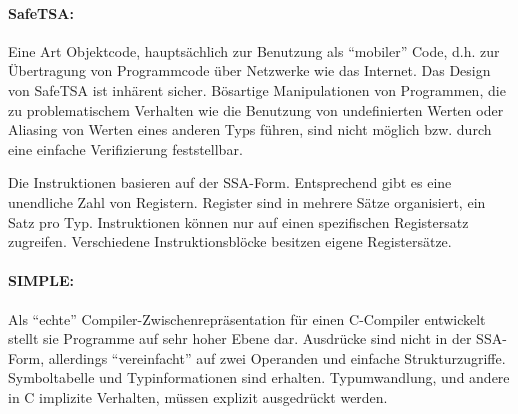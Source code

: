 \documentclass[twoside,a4paper,fleqn,12pt]{article}
\begin{document}


\paragraph{SafeTSA:} Eine Art Objektcode, hauptsächlich zur Benutzung
als "`mobiler"' Code, d.h. zur Übertragung von Programmcode über Netzwerke wie das Internet.
Das Design von SafeTSA ist inhärent sicher. Bösartige Manipulationen von Programmen, die zu
problematischem Verhalten wie die Benutzung von undefinierten Werten oder Aliasing von Werten
eines anderen Typs führen, sind nicht möglich bzw. durch eine einfache Verifizierung feststellbar.

Die Instruktionen basieren auf der SSA-Form. Entsprechend gibt es eine unendliche Zahl von Registern.
Register sind in mehrere Sätze organisiert, ein Satz pro Typ. Instruktionen können nur auf einen
spezifischen Registersatz zugreifen. Verschiedene Instruktionsblöcke besitzen eigene Registersätze.


\paragraph{SIMPLE:} Als "`echte"' Compiler-Zwischenrepräsentation für einen C-Compiler entwickelt
stellt sie Programme auf sehr hoher Ebene dar. Ausdrücke sind nicht in der SSA-Form, allerdings
"`vereinfacht"' auf zwei Operanden und einfache Strukturzugriffe. Symboltabelle und Typinformationen
sind erhalten. Typumwandlung, und andere in C implizite Verhalten, müssen explizit ausgedrückt werden.
\end{document}
